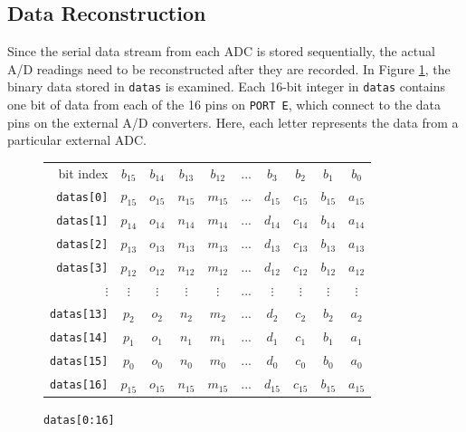 \documentclass[11pt,twoside]{mitthesis}
\begin{document}
\subsection{Data Reconstruction}

Since the serial data stream from each ADC is stored sequentially, the actual A/D readings need to be reconstructed after they are recorded.
In Figure \ref{fig:data-reconstruct}, the binary data stored in \texttt{datas} is examined.
Each 16-bit integer in \texttt{datas} contains one bit of data from each of the 16 pins on \texttt{PORT E}, which connect to the data pins on the external A/D converters.
Here, each letter represents the data from a particular external ADC.

\begin{figure}[h]
\begin{center}
\begin{tabular}{ r|c c c c c c c c c | }

\multicolumn{1}{r}{bit index}
 &  \multicolumn{1}{c}{$b_{15}$}
 &  \multicolumn{1}{c}{$b_{14}$}
 &  \multicolumn{1}{c}{$b_{13}$}
 &  \multicolumn{1}{c}{$b_{12}$}
 &  \multicolumn{1}{c}{$...$}
 &  \multicolumn{1}{c}{$b_{3}$}
 &  \multicolumn{1}{c}{$b_{2}$}
 &  \multicolumn{1}{c}{$b_{1}$}
 &  \multicolumn{1}{c}{$b_{0}$}\\
\cline{2-10}
\texttt{datas[0]} 
 & $p_{15}$ & $o_{15}$ & $n_{15}$ & $m_{15}$ & ... & $d_{15}$ & $c_{15}$ & $b_{15}$ & $a_{15}$
  \\ \cline{2-10} \cline{2-10}
 \texttt{datas[1]} 
 & $p_{14}$ & $o_{14}$ & $n_{14}$ & $m_{14}$ & ... & $d_{14}$ & $c_{14}$ & $b_{14}$ & $a_{14}$
  \\  \cline{2-10} 
 \texttt{datas[2]} 
 & $p_{13}$ & $o_{13}$ & $n_{13}$ & $m_{13}$ & ... & $d_{13}$ & $c_{13}$ & $b_{13}$ & $a_{13}$
  \\  \cline{2-10} 
 \texttt{datas[3]} 
 & $p_{12}$ & $o_{12}$ & $n_{12}$ & $m_{12}$ & ... & $d_{12}$ & $c_{12}$ & $b_{12}$ & $a_{12}$
  \\  \cline{2-10} 
$\vdots$\hspace{2em}
 & $\vdots$ & $\vdots$ & $\vdots$ & $\vdots$ & ... & $\vdots$ & $\vdots$ & $\vdots$ & $\vdots$
  \\  \cline{2-10} 
 \texttt{datas[13]}
 & $p_{2}$ & $o_{2}$ & $n_{2}$ & $m_{2}$ & ... & $d_{2}$ & $c_{2}$ & $b_{2}$ & $a_{2}$
  \\  \cline{2-10} 
 \texttt{datas[14]}
 & $p_{1}$ & $o_{1}$ & $n_{1}$ & $m_{1}$ & ... & $d_{1}$ & $c_{1}$ & $b_{1}$ & $a_{1}$
  \\  \cline{2-10} 
 \texttt{datas[15]}
 & $p_{0}$ & $o_{0}$ & $n_{0}$ & $m_{0}$ & ... & $d_{0}$ & $c_{0}$ & $b_{0}$ & $a_{0}$
  \\  \cline{2-10} 
 \texttt{datas[16]}
 & $p_{15}$ & $o_{15}$ & $n_{15}$ & $m_{15}$ & ... & $d_{15}$ & $c_{15}$ & $b_{15}$ & $a_{15}$
  \\  \cline{2-10} 
\end{tabular}
\end{center}
\caption{\texttt{datas[0:16]}}
\label{fig:data-reconstruct}
\end{figure}
\end{document}
